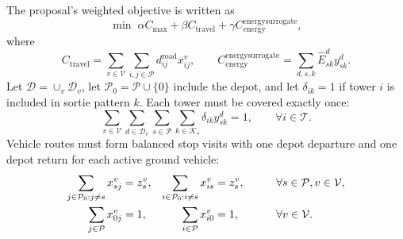 \documentclass[final,5p,twocolumn,number,nopreprintline]{elsarticle}
\begin{document}
The proposal's weighted objective is written as
\begin{equation}
\min \; \alpha C_{\max}+\beta C_{\mathrm{travel}}+\gamma C_{\mathrm{energy}}^{\mathrm{energy surrogate}},
\label{eq:objective}
\end{equation}
where
\begin{equation}
C_{\mathrm{travel}}=\sum_{v\in\mathcal{V}}\sum_{i,j\in\mathcal{P}} d^{\mathrm{road}}_{ij}x^v_{ij},
\qquad
C_{\mathrm{energy}}^{\mathrm{energy surrogate}}=\sum_{d,s,k}\hat E^d_{sk}y^d_{sk}.
\end{equation}
Let $\mathcal{D}=\cup_v\mathcal{D}_v$, let $\mathcal{P}_0=\mathcal{P}\cup\{0\}$ include the depot, and let $\delta_{ik}=1$ if tower $i$ is included in sortie pattern $k$. Each tower must be covered exactly once:
\begin{equation}
\sum_{v\in\mathcal{V}}\sum_{d\in\mathcal{D}_v}\sum_{s\in\mathcal{P}}\sum_{k\in\mathcal{K}_s}\delta_{ik}y^d_{sk}=1,\qquad \forall i\in\mathcal{T}.
\label{eq:tower-coverage}
\end{equation}
Vehicle routes must form balanced stop visits with one depot departure and one depot return for each active ground vehicle:
\begin{align}
\sum_{j\in\mathcal{P}_0:j\ne s}x^v_{sj} &= z_s^v,&
\sum_{i\in\mathcal{P}_0:i\ne s}x^v_{is} &= z_s^v,\qquad &&\forall s\in\mathcal{P},v\in\mathcal{V},\notag\\
\sum_{j\in\mathcal{P}}x^v_{0j} &= 1,&
\sum_{i\in\mathcal{P}}x^v_{i0} &= 1,\qquad &&\forall v\in\mathcal{V}.
\label{eq:vehicle-flow}
\end{align}
\end{document}
